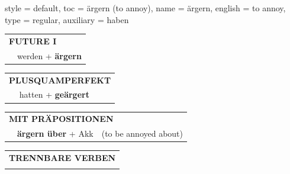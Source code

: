 \begin{verbentry}{
  style = {default},
  toc = {ärgern (to annoy)},
  name = {ärgern},
  english = {to annoy},
  type = {regular},
  auxiliary = {haben}
}
\begin{tabular}{rl}
    \multicolumn{2}{l}{\textbf{FUTURE I} }\\
   & werden + \textbf{ärgern}\\
 
  \end{tabular}
\hfill
   \begin{tabular}{rl}
      \multicolumn{2}{l}{\textbf{PLUSQUAMPERFEKT}}\\
   & hatten + \textbf{geärgert}\\
  \end{tabular}

   \vspace{10pt}

   \begin{tabular}{lll}
      \multicolumn{3}{l}{\textbf{MIT PRÄPOSITIONEN}}\\
& \textbf{ärgern über} + Akk & (to be annoyed about)\\
   \end{tabular}
  \hfill
   \begin{tabular}{lll}
      \multicolumn{3}{l}{\textbf{TRENNBARE VERBEN}}\\
\vspace{10pt}
  \end{tabular}

\vspace{-5pt}
\end{verbentry}

